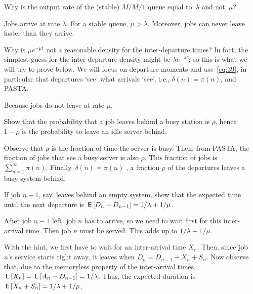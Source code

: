 \begin{extra}
Why is the output rate of the (stable) $M/M/1$ queue equal to~$\lambda$ and not~$\mu$?
\begin{solution}
Jobs arrive at rate $\lambda$. For a stable queue, $\mu>\lambda$. Moreover, jobs can never leave faster than they arrive.
\end{solution}
\end{extra}


\begin{extra}
 Why is $\mu e^{-\mu t}$ not a reasonable density for the inter-departure times?
 In fact, the simplest guess for the inter-departure density might be $\lambda e^{-\lambda t}$; so this is what we will try to prove below.
We will focus on departure moments and use~\cref{eq:39}, in particular that departures `see' what arrivals `see', i.e., $\delta(n)= \pi(n)$, and PASTA.
\begin{solution}
 Because jobs do not leave at rate $\mu$. 
\end{solution}
\end{extra}




\begin{extra}
Show that the probability that a job leaves behind a busy station is $\rho$, hence $1-\rho$ is the probability to leave an idle server behind.
\begin{solution}
Observe that $\rho$ is the fraction of time the server is busy. Then, from PASTA, the fraction of jobs that see a busy server is also $\rho$. This fraction of jobs is $\sum_{n=1}^\infty \pi(n)$. Finally, $\delta(n) = \pi(n)$ , a fraction $\rho$ of the departures leaves a busy system behind.

\end{solution}
\end{extra}


\begin{extra}
 If job $n-1$, say, leaves behind an empty system, show that the expected time until the next departure is $\,\mathsf{E}\left[D_n - D_{n-1}\right] = 1/\lambda + 1/\mu$. 
\begin{hint}
 After job $n-1$ left, job $n$ has to arrive, so we need to wait first for this inter-arrival time. Then job $n$ must be served. This adds up to $1/\lambda + 1/\mu$. 
\end{hint}
\begin{solution}
With the hint, we first have to wait for an inter-arrival
 time $X_n$. Then, since job $n$'s service starts right away, it
 leaves when $D_n = D_{n-1}+X_n + S_n$. Now observe that, due to the memoryless property of the inter-arrival times, $\,\mathsf{E}\left[X_n\right] = \,\mathsf{E}\left[A_n - D_{n-1}\right] = 1/\lambda$. Thus, the expected duration is $\,\mathsf{E}\left[X_n + S_n\right]=1/\lambda + 1/\mu$. 
\end{solution}
\end{extra}


